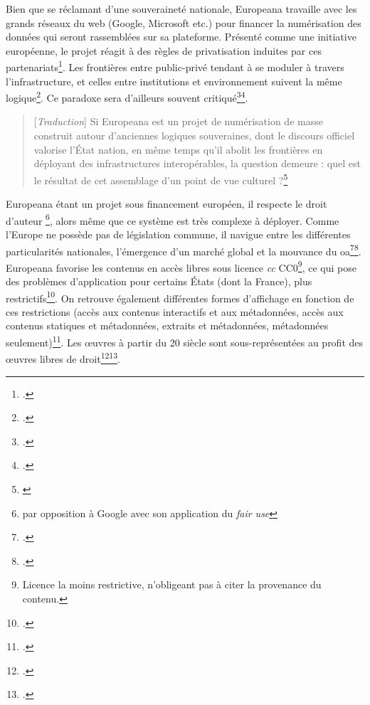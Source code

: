 Bien que se réclamant d'une souveraineté nationale, Europeana travaille avec les grands réseaux du web (Google, Microsoft etc.) pour financer la numérisation des données qui seront rassemblées sur sa plateforme. Présenté comme une initiative européenne, le projet réagit à des règles de privatisation induites par ces partenariats\footcite{thelle_persuasive_2011}. Les frontières entre public-privé tendant à se moduler à travers l'infrastructure, et celles entre institutions et environnement suivent la même logique\footcite[p.63]{thylstrup_politics_2018}. Ce paradoxe sera d'ailleurs souvent critiqué\footcite{thelle_persuasive_2011}\footcite{thelle_persuasive_2011}.

\begin{quotation}
[\textit{Traduction}]
Si Europeana est un projet de numérisation de masse construit autour d'anciennes logiques souveraines, dont le discours officiel valorise l'État nation, en même temps qu'il abolit les frontières en déployant des infrastructures interopérables, la question demeure : quel est le résultat de cet assemblage d'un point de vue culturel ?\footnote{\cite[p.73]{thylstrup_politics_2018}}
\end{quotation}

Europeana étant un projet sous financement européen, il respecte le droit d'auteur \footnote{par opposition à Google avec son application du \textit{fair use}}, alors même que ce système est très complexe à déployer. Comme l'Europe ne possède pas de législation commune, il navigue entre les différentes particularités nationales, l'émergence d'un marché global et la mouvance du \gls{oa}\footcite{thylstrup_politics_2018}\footcite{weiss_using_2014}. Europeana favorise les contenus en accès libres sous licence \textit{\gls{cc}} CC0\footnote{Licence la moins restrictive, n'obligeant pas à citer la provenance du contenu.}, ce qui pose des problèmes d'application pour certains États (dont la France), plus restrictifs\footcite{noauthor_european_2019}. On retrouve également différentes formes d'affichage en fonction de ces restrictions (accès aux contenus interactifs et aux métadonnées, accès aux contenus statiques et métadonnées, extraits et métadonnées, métadonnées seulement)\footcite{willems_europeana_2015}. Les \oe{}uvres à partir du 20 siècle sont sous-représentées au profit des \oe{}uvres libres de droit\footcite{dufrene_numerisation_2013}\footcite{stobo_i_2018}.

